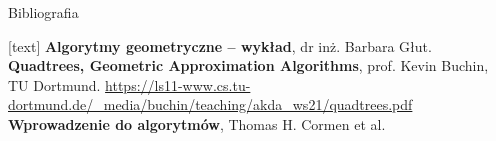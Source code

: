 \documentclass[aspectratio=169,dvipsnames]{beamer}
\begin{document}
\begin{frame}{Bibliografia}
    \begin{thebibliography}{9}
        [text]
         \textbf{Algorytmy geometryczne -- wykład}, dr inż. Barbara Głut.
         \textbf{Quadtrees, Geometric Approximation Algorithms}, prof. Kevin Buchin, TU Dortmund.
            \url{https://ls11-www.cs.tu-dortmund.de/_media/buchin/teaching/akda_ws21/quadtrees.pdf}
         \textbf{Wprowadzenie do algorytmów}, Thomas H. Cormen et al.
    \end{thebibliography}
\end{frame}
\end{document}
